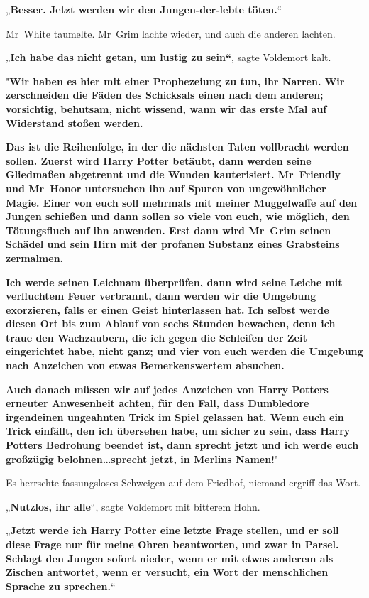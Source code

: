 {„\textbf{Besser. Jetzt werden wir den Jungen-der-lebte töten.}“

Mr~White taumelte. Mr~Grim lachte wieder, und auch die anderen lachten.

„\textbf{Ich habe das nicht getan, um lustig zu sein“}, sagte Voldemort kalt.

"\textbf{Wir haben es hier mit einer Prophezeiung zu tun, ihr Narren. Wir zerschneiden die Fäden des Schicksals einen nach dem anderen; vorsichtig, behutsam, nicht wissend, wann wir das erste Mal auf Widerstand stoßen werden.}

\textbf{\hfill\break Das ist die Reihenfolge, in der die nächsten Taten vollbracht werden sollen. Zuerst wird Harry Potter betäubt, dann werden seine Gliedmaßen abgetrennt und die Wunden kauterisiert. Mr~Friendly und Mr~Honor untersuchen ihn auf Spuren von ungewöhnlicher Magie. Einer von euch soll mehrmals mit meiner Muggelwaffe auf den Jungen schießen und dann sollen so viele von euch, wie möglich, den Tötungsfluch auf ihn anwenden. Erst dann wird Mr~Grim seinen Schädel und sein Hirn mit der profanen Substanz eines Grabsteins zermalmen.}

\textbf{\hfill\break Ich werde seinen Leichnam überprüfen, dann wird seine Leiche mit verfluchtem Feuer verbrannt, dann werden wir die Umgebung exorzieren, falls er einen Geist hinterlassen hat. Ich selbst werde diesen Ort bis zum Ablauf von sechs Stunden bewachen, denn ich traue den Wachzaubern, die ich gegen die Schleifen der Zeit eingerichtet habe, nicht ganz; und vier von euch werden die Umgebung nach Anzeichen von etwas Bemerkenswertem absuchen.}

\textbf{\hfill\break Auch danach müssen wir auf jedes Anzeichen von Harry Potters erneuter Anwesenheit achten, für den Fall, dass Dumbledore irgendeinen ungeahnten Trick im Spiel gelassen hat. Wenn euch ein Trick einfällt, den ich übersehen habe, um sicher zu sein, dass Harry Potters Bedrohung beendet ist, dann sprecht jetzt und ich werde euch großzügig belohnen…sprecht jetzt, in Merlins Namen!}"

Es herrschte fassungsloses Schweigen auf dem Friedhof, niemand ergriff das Wort.

„\textbf{Nutzlos, ihr alle}“, sagte Voldemort mit bitterem Hohn.

„\textbf{Jetzt werde ich Harry Potter eine letzte Frage stellen, und er soll diese Frage nur für meine Ohren beantworten, und zwar in Parsel. Schlagt den Jungen sofort nieder, wenn er mit etwas anderem als Zischen antwortet, wenn er versucht, ein Wort der menschlichen Sprache zu sprechen.}“

}
